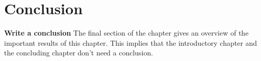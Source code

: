 \section{Conclusion}
\textbf{Write a conclusion}
The final section of the chapter gives an overview of the important results
of this chapter. This implies that the introductory chapter and the
concluding chapter don't need a conclusion.





